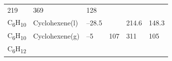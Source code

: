 \documentclass[
  9pt,
]{extbook}
\theoremstyle{definition}
\theoremstyle{definition}
\theoremstyle{definition}
\theoremstyle{remark}
\begin{document}
\begin{longtable}[]{@{}llllll@{}}
\begin{minipage}[t]{0.15\columnwidth}
219\strut
\end{minipage} & \begin{minipage}[t]{0.14\columnwidth}\raggedright
369\strut
\end{minipage} & \begin{minipage}[t]{0.14\columnwidth}\raggedright
128\strut
\end{minipage}\tabularnewline
\begin{minipage}[t]{0.07\columnwidth}\raggedright
C\textsubscript{6}H\textsubscript{10}\strut
\end{minipage} & \begin{minipage}[t]{0.17\columnwidth}\raggedright
Cyclohexene(l)\strut
\end{minipage} & \begin{minipage}[t]{0.15\columnwidth}\raggedright
--28.5\strut
\end{minipage} & \begin{minipage}[t]{0.15\columnwidth}\raggedright
\strut
\end{minipage} & \begin{minipage}[t]{0.14\columnwidth}\raggedright
214.6\strut
\end{minipage} & \begin{minipage}[t]{0.14\columnwidth}\raggedright
148.3\strut
\end{minipage}\tabularnewline
\begin{minipage}[t]{0.07\columnwidth}\raggedright
C\textsubscript{6}H\textsubscript{10}\strut
\end{minipage} & \begin{minipage}[t]{0.17\columnwidth}\raggedright
Cyclohexene(g)\strut
\end{minipage} & \begin{minipage}[t]{0.15\columnwidth}\raggedright
--5\strut
\end{minipage} & \begin{minipage}[t]{0.15\columnwidth}\raggedright
107\strut
\end{minipage} & \begin{minipage}[t]{0.14\columnwidth}\raggedright
311\strut
\end{minipage} & \begin{minipage}[t]{0.14\columnwidth}\raggedright
105\strut
\end{minipage}\tabularnewline
\begin{minipage}[t]{0.07\columnwidth}\raggedright
C\textsubscript{6}H\textsubscript{12}\strut
\end{minipage} & \begin{minipage}[t]{0.17\columnwidth}\raggedright

\end{minipage}
\end{longtable}
\end{document}
